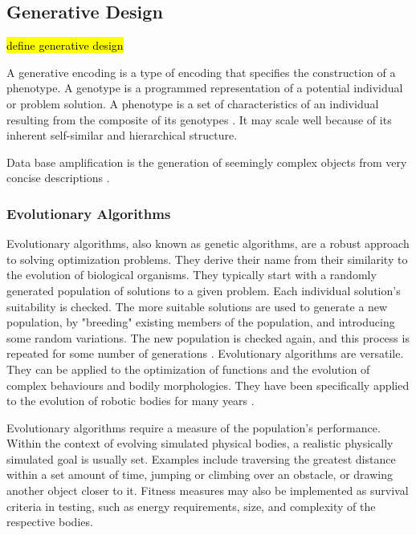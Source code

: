 \subsection{Generative Design}

\hl{define generative design}

A generative encoding is a type of encoding that specifies the construction of a phenotype. A genotype is a programmed representation of a potential individual or problem solution. A phenotype is a set of characteristics of an individual resulting from the composite of its genotypes \cite{Sims1994a}. It may scale well because of its inherent self-similar and hierarchical structure. \cite{Hornby2001b}

Data base amplification is the generation of seemingly complex objects from very concise descriptions \cite{Prusinkiewicz2004}.

\subsubsection{Evolutionary Algorithms}

Evolutionary algorithms, also known as genetic algorithms, are a robust approach to solving optimization problems. They derive their name from their similarity to the evolution of biological organisms. They typically start with a randomly generated population of solutions to a given problem. Each individual solution's suitability is checked. The more suitable solutions are used to generate a new population, by "breeding" existing members of the population, and introducing some random variations. The new population is checked again, and this process is repeated for some number of generations \cite{Groenwold1999}. Evolutionary algorithms are versatile. They can be applied to the optimization of functions and the evolution of complex behaviours and bodily morphologies. They have been specifically applied to the evolution of robotic bodies for many years \cite{Sims1994a,Sims1994b}.

Evolutionary algorithms require a measure of the population's performance. Within the context of evolving simulated physical bodies, a realistic physically simulated goal is usually set. Examples include traversing the greatest distance within a set amount of time, jumping or climbing over an obstacle, or drawing another object closer to it. Fitness measures may also be implemented as survival criteria in testing, such as energy requirements, size, and complexity of the respective bodies. \cite{Sims1994a, Sims1994b}

